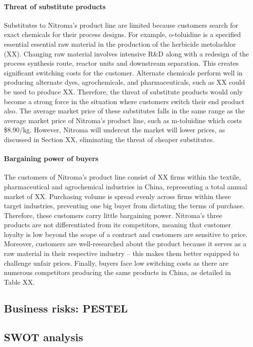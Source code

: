 \paragraph{Threat of substitute products}
Substitutes to Nitroma’s product line are limited because customers search for exact chemicals for their process designs. For example, o-toluidine is a specified essential essential raw material in the production of the herbicide metolachlor (XX). Changing raw material involves intensive R&D along with a redesign of the process synthesis route, reactor units and downstream separation. This creates significant switching costs for the customer. Alternate chemicals perform well in producing alternate dyes, agrochemicals, and pharmaceuticals, such as XX could be used to produce XX. Therefore, the threat of substitute products would only become a strong force in the situation where customers switch their end product also. The average market price of these substitutes falls in the same range as the average market price of Nitroma’s product line, such as m-toluidine which costs \$8.90/kg. However, Nitroma will undercut the market will lower prices, as discussed in Section XX, eliminating the threat of cheaper substitutes. 

\paragraph{Bargaining power of buyers}
The customers of Nitroma’s product line consist of XX firms within the textile, pharmaceutical and agrochemical industries in China, representing a total annual market of XX. Purchasing volume is spread evenly across firms within these target industries, preventing one big buyer from dictating the terms of purchase. Therefore, these customers carry little bargaining power. Nitroma’s three products are not differentiated from its competitors, meaning that customer loyalty is low beyond the scope of a contract and customers are sensitive to price. Moreover, customers are well-researched about the product because it serves as a raw material in their respective industry – this makes them better equipped to challenge unfair prices. Finally, buyers face low switching costs as there are numerous competitors producing the same products in China, as detailed in Table XX.

\subsection{Business risks: PESTEL}
\subsection{SWOT analysis}